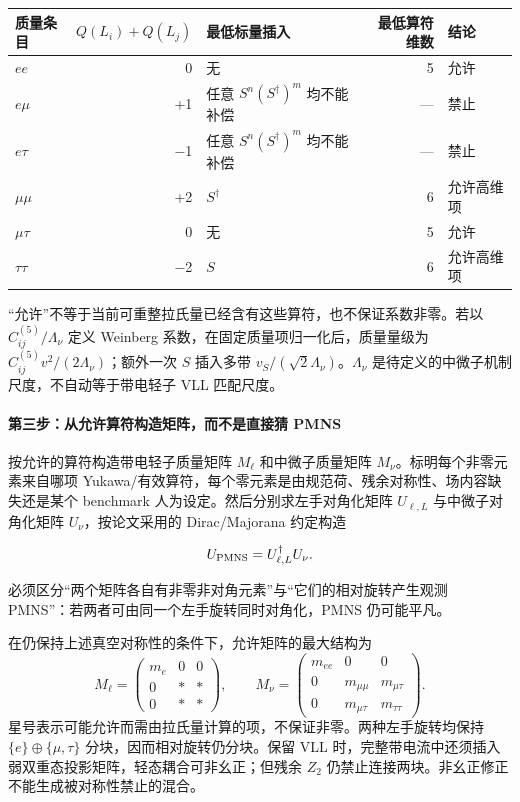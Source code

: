 \documentclass[
]{article}
\begin{document}
\begin{longtable}[]{@{}lrlrl@{}}
\toprule\noalign{}
质量条目 & \(Q(L_i)+Q(L_j)\) & 最低标量插入 & 最低算符维数 & 结论 \\
\midrule\noalign{}
\endhead
\bottomrule\noalign{}
\endlastfoot
\(ee\) & 0 & 无 & 5 & 允许 \\
\(e\mu\) & +1 & 任意 \(S^n(S^\dagger)^m\) 均不能补偿 & --- & 禁止 \\
\(e\tau\) & −1 & 任意 \(S^n(S^\dagger)^m\) 均不能补偿 & --- & 禁止 \\
\(\mu\mu\) & +2 & \(S^\dagger\) & 6 & 允许高维项 \\
\(\mu\tau\) & 0 & 无 & 5 & 允许 \\
\(\tau\tau\) & −2 & \(S\) & 6 & 允许高维项 \\
\end{longtable}

``允许''不等于当前可重整拉氏量已经含有这些算符，也不保证系数非零。若以
\(C_{ij}^{(5)}/\Lambda_\nu\) 定义 Weinberg
系数，在固定质量项归一化后，质量量级为
\(C_{ij}^{(5)}v^2/(2\Lambda_\nu)\)；额外一次 \(S\) 插入多带
\(v_S/(\sqrt2\Lambda_\nu)\)。\(\Lambda_\nu\)
是待定义的中微子机制尺度，不自动等于带电轻子 VLL 匹配尺度。

\paragraph{第三步：从允许算符构造矩阵，而不是直接猜
PMNS}\label{ux7b2cux4e09ux6b65ux4eceux5141ux8bb8ux7b97ux7b26ux6784ux9020ux77e9ux9635ux800cux4e0dux662fux76f4ux63a5ux731c-pmns}

按允许的算符构造带电轻子质量矩阵 \(M_\ell\) 和中微子质量矩阵
\(M_\nu\)。标明每个非零元素来自哪项
Yukawa/有效算符，每个零元素是由规范荷、残余对称性、场内容缺失还是某个
benchmark 人为设定。然后分别求左手对角化矩阵 \(U_{\ell,L}\)
与中微子对角化矩阵 \(U_\nu\)，按论文采用的 Dirac/Majorana 约定构造

\[U_{\rm PMNS}=U_{\ell,L}^\dagger U_\nu.\]

必须区分``两个矩阵各自有非零非对角元素''与``它们的相对旋转产生观测
PMNS''：若两者可由同一个左手旋转同时对角化，PMNS 仍可能平凡。

在仍保持上述真空对称性的条件下，允许矩阵的最大结构为 \[
M_\ell=\begin{pmatrix}m_e&0&0\\0&*&*\\0&*&*\end{pmatrix},\qquad
M_\nu=\begin{pmatrix}m_{ee}&0&0\\0&m_{\mu\mu}&m_{\mu\tau}\\0&m_{\mu\tau}&m_{\tau\tau}\end{pmatrix}.
\] 星号表示可能允许而需由拉氏量计算的项，不保证非零。两种左手旋转均保持
\(\{e\}\oplus\{\mu,\tau\}\) 分块，因而相对旋转仍分块。保留 VLL
时，完整带电流中还须插入弱双重态投影矩阵，轻态耦合可非幺正；但残余
\(Z_2\) 仍禁止连接两块。非幺正修正不能生成被对称性禁止的混合。
\end{document}
